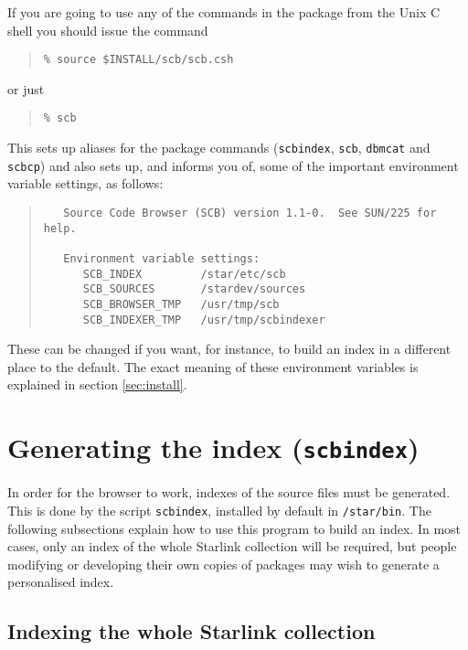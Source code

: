 \documentclass[twoside,11pt]{article}
\newcommand{\xlabel}[1]{}
\renewcommand{\_}{\texttt{\symbol{95}}}
\begin{document}
If you are going to use any of the commands in the package from the
Unix C shell you should issue the command
\begin{quote}
\begin{verbatim}
% source $INSTALL/scb/scb.csh
\end{verbatim}
\end{quote}
or just
\begin{quote}
\begin{verbatim}
% scb
\end{verbatim}
\end{quote}
This sets up aliases for the package commands 
({\tt scbindex}, {\tt scb}, {\tt dbmcat} and {\tt scbcp})
and also sets up, and informs you of, some of 
the important environment variable settings, as follows:
\begin{quote}
\begin{verbatim}
   Source Code Browser (SCB) version 1.1-0.  See SUN/225 for help.
 
   Environment variable settings:
      SCB_INDEX         /star/etc/scb
      SCB_SOURCES       /stardev/sources
      SCB_BROWSER_TMP   /usr/tmp/scb
      SCB_INDEXER_TMP   /usr/tmp/scbindexer
\end{verbatim}
\end{quote}
These can be changed if you want, for instance, to build an index in 
a different place to the default.
The exact meaning of these environment variables is explained in 
section \ref{sec:install}.




\section{\xlabel{sec:indexing}\label{sec:indexing}Generating the index
         ({\tt scbindex})}

In order for the browser to work, indexes of the source files must be
generated.  This is done by the script {\tt scbindex}, installed
by default in {\tt /star/bin}.
The following subsections explain how to use this program to
build an index.  In most cases, only an index of the whole Starlink
collection will be required, but people modifying or developing
their own copies of packages may wish to generate a personalised index.


\subsection{\xlabel{sec:indexing-all}\label{sec:indexing-all}Indexing the whole Starlink collection}
\end{document}
